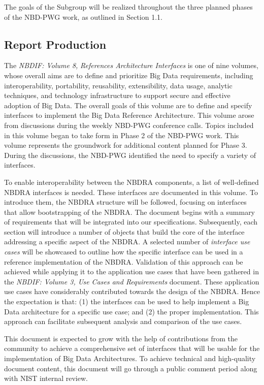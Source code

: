 \documentclass[9pt,]{article}
\begin{document}
The goals of the Subgroup will be realized throughout the three planned
phases of the NBD-PWG work, as outlined in Section 1.1.

\hypertarget{report-production}{%
\subsection{Report Production}\label{report-production}}

The \emph{NBDIF: Volume 8,} \emph{References Architecture Interfaces} is
one of nine volumes, whose overall aims are to define and prioritize Big
Data requirements, including interoperability, portability, reusability,
extensibility, data usage, analytic techniques, and technology
infrastructure to support secure and effective adoption of Big Data. The
overall goals of this volume are to define and specify interfaces to
implement the Big Data Reference Architecture. This volume arose from
discussions during the weekly NBD-PWG conference calls. Topics included
in this volume began to take form in Phase 2 of the NBD-PWG work. This
volume represents the groundwork for additional content planned for
Phase 3. During the discussions, the NBD-PWG identified the need to
specify a variety of interfaces.

To enable interoperability between the NBDRA components, a list of
well-defined NBDRA interfaces is needed. These interfaces are documented
in this volume. To introduce them, the NBDRA structure will be followed,
focusing on interfaces that allow bootstrapping of the NBDRA. The
document begins with a summary of requirements that will be integrated
into our specifications. Subsequently, each section will introduce a
number of objects that build the core of the interface addressing a
specific aspect of the NBDRA. A selected number of \emph{interface use
cases} will be showcased to outline how the specific interface can be
used in a reference implementation of the NBDRA. Validation of this
approach can be achieved while applying it to the application use cases
that have been gathered in the \emph{NBDIF: Volume 3, Use Cases and
Requirements} document. These application use cases have considerably
contributed towards the design of the NBDRA. Hence the expectation is
that: (1) the interfaces can be used to help implement a Big Data
architecture for a specific use case; and (2) the proper implementation.
This approach can facilitate subsequent analysis and comparison of the
use cases.

This document is expected to grow with the help of contributions from
the community to achieve a comprehensive set of interfaces that will be
usable for the implementation of Big Data Architectures. To achieve
technical and high-quality document content, this document will go
through a public comment period along with NIST internal review.
\end{document}
